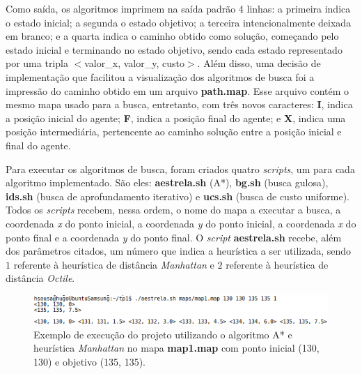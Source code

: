 \documentclass[12pt]{article}
\begin{document}
Como saída, os algoritmos imprimem na saída padrão 4 linhas: a primeira indica o estado inicial; a segunda o estado objetivo; a terceira intencionalmente deixada em branco; e a quarta indica o caminho obtido como solução, começando pelo estado inicial e terminando no estado objetivo, sendo cada estado representado por uma tripla $<$valor\_x, valor\_y, custo$>$. Além disso, uma decisão de implementação que facilitou a visualização dos algoritmos de busca foi a impressão do caminho obtido em um arquivo \textbf{path.map}. Esse arquivo contém o mesmo mapa usado para a busca, entretanto, com três novos caracteres: \textbf{I}, indica a posição inicial do agente; \textbf{F}, indica a posição final do agente; e \textbf{X}, indica uma posição intermediária, pertencente ao caminho solução entre a posição inicial e final do agente.

Para executar os algoritmos de busca, foram criados quatro \textit{scripts}, um para cada algoritmo implementado. São eles: \textbf{aestrela.sh} (A*), \textbf{bg.sh} (busca gulosa), \textbf{ids.sh} (busca de aprofundamento iterativo) e \textbf{ucs.sh} (busca de custo uniforme). Todos os \textit{scripts} recebem, nessa ordem, o nome do mapa a executar a busca, a coordenada \textit{x} do ponto inicial, a coordenada \textit{y} do ponto inicial, a coordenada \textit{x} do ponto final e a coordenada \textit{y} do ponto final. O \textit{script} \textbf{aestrela.sh} recebe, além dos parâmetros citados, um número que indica a heurística a ser utilizada, sendo $ 1 $ referente à heurística de distância \textit{Manhattan} e $ 2 $ referente à heurística de distância \textit{Octile}.

\begin{figure}[htp!]
	\begin{center}
	  \includegraphics[scale=0.8]{exec.png}
	\end{center}
	\caption{Exemplo de execução do projeto utilizando o algoritmo A* e heurística \textit{Manhattan} no mapa \textbf{map1.map} com ponto inicial (130, 130) e objetivo (135, 135).}
	\label{fig:exec}
\end{figure}
\end{document}
